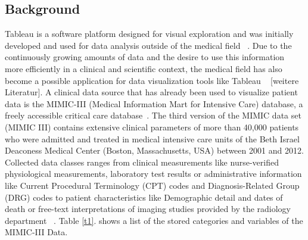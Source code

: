 \documentclass[aac,crcready]{iosart2x}
\begin{document}
\subsection{Background}\label{s1.1}
%
Tableau is a software platform designed for visual exploration and was initially developed and used for data analysis outside of the medical field ~\cite{Tableau.2021}. Due to the continuously growing amounts of data and the desire to use this information more efficiently in a clinical and scientific context, the medical field has also become a possible application for data visualization tools like Tableau ~\cite{Ko.2017} [weitere Literatur]. 
A clinical data source that has already been used to visualize patient data is the MIMIC-III (Medical Information Mart for Intensive Care) database, a freely accessible critical care database~\cite{Festag.2019,Lee.2016,Johnson.2020,Johnson.2016}. The third version of the MIMIC data set (MIMIC III) contains extensive clinical parameters of more than 40,000 patients who were admitted and treated in medical intensive care units of the Beth Israel Deaconess Medical Center (Boston, Massachusetts, USA) between 2001 and 2012. Collected data classes ranges from clinical measurements like nurse-verified physiological measurements, laboratory test results or administrative information like Current Procedural Terminology (CPT) codes and Diagnosis-Related Group (DRG) codes to patient characteristics like Demographic detail and dates of death or free-text interpretations of imaging studies provided by the radiology department ~\cite{Johnson.2020,Johnson.2016}.
Table \ref{t1}. shows a list of the stored categories and variables of the MIMIC-III Data.
\end{document}
